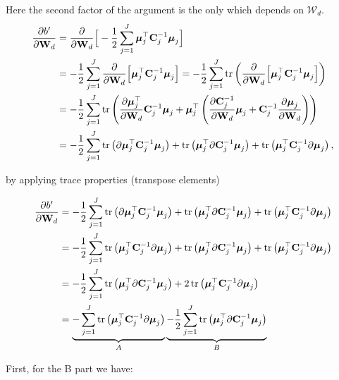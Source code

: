 \documentclass[]{article}
\newcommand{\tr}{\operatorname{tr}}
\newcommand{\C}{\boldsymbol{\Lambda}_j}
\newcommand{\Cin}{\mathbf{C}_j}
\newcommand{\muJ}{\boldsymbol{\mu}_j}
\newcommand{\projMat}{\boldsymbol{\mathcal{W}}_d}
\newcommand{\projMatI}{\mathbf{W}_d}
\newcommand{\dWjIn}{\partial\projMatI}
\newcommand{\kawx}{\mathbf{\hat{k}}_d }
\begin{document}
Here the second factor of the argument is the only which depends on $\projMat$.
\begin{align}
\frac{\partial b'}{\dWjIn} &= \frac{\partial}{\dWjIn}\Big[-\frac{1}{2}\sum_{j=1}^{J}\muJ^\top\Cin^{-1}\muJ \Big] \notag \\
&=-\frac{1}{2}\sum_{j=1}^{J}\frac{\partial}{\dWjIn}\Big[\muJ^\top\Cin^{-1}\muJ \Big] =-\frac{1}{2}\sum_{j=1}^{J}\tr\left(\frac{\partial}{\dWjIn}\Big[\muJ^\top\Cin^{-1}\muJ \Big]\right) \notag \\
&=-\frac{1}{2}\sum_{j=1}^{J}\tr\left(\frac{\partial \muJ^\top}{\dWjIn}\Cin^{-1}\muJ + \muJ^\top\left(\frac{\partial \Cin^{-1}}{\dWjIn}\muJ+\Cin^{-1}\frac{\partial \muJ}{\dWjIn}\right)\right) \notag \\
& = -\frac{1}{2}\sum_{j=1}^{J} \tr\left(\partial \muJ^\top\Cin^{-1}\muJ\right) + \tr\left( \muJ^\top\partial\Cin^{-1}\muJ\right) + \tr\left( \muJ^\top\Cin^{-1}\partial\muJ\right),
\end{align}

by applying trace properties (transpose elements)

\begin{align}
\frac{\partial b'}{\dWjIn} &= -\frac{1}{2}\sum_{j=1}^{J} \tr\left(\partial \muJ^\top\Cin^{-1}\muJ\right) + \tr\left( \muJ^\top\partial\Cin^{-1}\muJ\right) + \tr\left( \muJ^\top\Cin^{-1}\partial\muJ\right) \notag \\
&=  -\frac{1}{2}\sum_{j=1}^{J} \tr\left( \muJ^\top\Cin^{-1}\partial\muJ\right) + \tr\left( \muJ^\top\partial\Cin^{-1}\muJ\right) + \tr\left( \muJ^\top\Cin^{-1}\partial\muJ\right) \notag \\
&= -\frac{1}{2}\sum_{j=1}^{J} \tr\left( \muJ^\top\partial\Cin^{-1}\muJ\right) + 2\tr\left( \muJ^\top\Cin^{-1}\partial\muJ\right) \notag\\
&=  \underbrace{-\sum_{j=1}^{J}\tr\left( \muJ^\top\Cin^{-1}\partial\muJ\right)}_{A} \underbrace{-\frac{1}{2}\sum_{j=1}^{J} \tr\left( \muJ^\top\partial\Cin^{-1}\muJ\right)}_{B} 
\end{align}

First, for the B part we have:

\end{document}
